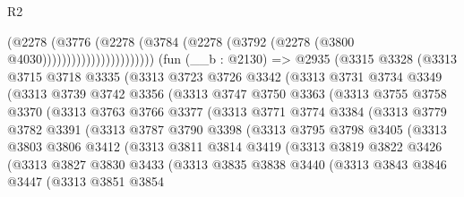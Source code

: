 \begin{lexlean}{R2}
\begin{coremodule}
                                  (@2278
                                    (@3776
                                      (@2278
                                        (@3784
                                          (@2278 (@3792 (@2278 (@3800 @4030)))))))))))))))))))))))
    (fun (__b : @2130) =>
    @2935
      (@3315
        @3328
        (@3313
          @3715
          @3718
          @3335
          (@3313
            @3723
            @3726
            @3342
            (@3313
              @3731
              @3734
              @3349
              (@3313
                @3739
                @3742
                @3356
                (@3313
                  @3747
                  @3750
                  @3363
                  (@3313
                    @3755
                    @3758
                    @3370
                    (@3313
                      @3763
                      @3766
                      @3377
                      (@3313
                        @3771
                        @3774
                        @3384
                        (@3313
                          @3779
                          @3782
                          @3391
                          (@3313
                            @3787
                            @3790
                            @3398
                            (@3313
                              @3795
                              @3798
                              @3405
                              (@3313
                                @3803
                                @3806
                                @3412
                                (@3313
                                  @3811
                                  @3814
                                  @3419
                                  (@3313
                                    @3819
                                    @3822
                                    @3426
                                    (@3313
                                      @3827
                                      @3830
                                      @3433
                                      (@3313
                                        @3835
                                        @3838
                                        @3440
                                        (@3313
                                          @3843
                                          @3846
                                          @3447
                                          (@3313
                                            @3851
                                            @3854

\end{coremodule}
\end{lexlean}
